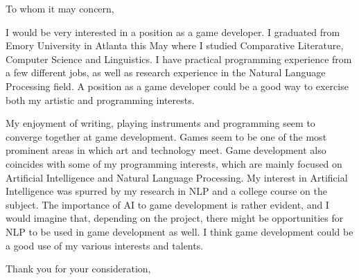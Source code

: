 
\signature{Walter Askew\\
  1745 Orrington Avenue\\
  Apartment 2N\\
  Evanston, IL 60201}

\begin{letter}{}
  \opening{To whom it may concern,}

  I would be very interested in a position as a game developer.
  I graduated from Emory University in Atlanta this May where I
  studied Comparative Literature, Computer Science and Linguistics.
  I have practical programming experience from a few different jobs,
  as well as research experience in the Natural Language Processing
  field.
  A position as a game developer could be a good way to exercise both
  my artistic and programming interests.

  My enjoyment of writing, playing instruments and programming seem to
  converge together at game development.
  Games seem to be one of the most prominent areas in which art and
  technology meet.
  Game development also coincides with some of my programming
  interests, which are mainly focused on Artificial Intelligence and
  Natural Language Processing.
  My interest in Artificial Intelligence was spurred by my research
  in NLP and a college course on the subject.
  The importance of AI to game development is rather evident,
  and I would imagine that, depending on the project,
  there might be opportunities for NLP to be used in game development
  as well.
  I think game development could be a good use of my various interests
  and talents.

  \closing{Thank you for your consideration,}
\end{letter}
